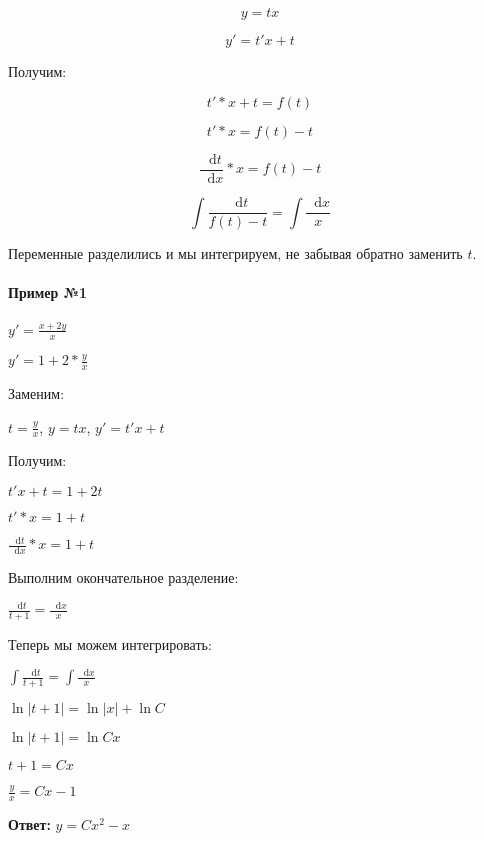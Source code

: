 \documentclass{article}
\newcommand*\diff{\mathop{}\!\mathrm{d}}
\begin{document}
$$y = tx$$

$$y' = t' x + t$$

Получим:

$$t' * x + t = f(t)$$

$$t' * x = f(t) - t$$

$$\frac{\diff t}{\diff x} * x = f(t) - t$$

$$\int \frac{\diff t}{f(t) - t} = \int \frac{\diff x}{x}$$

Переменные разделились и мы интегрируем, не забывая обратно заменить $t$.

\paragraph{Пример №1}

$y' = \frac{x + 2y}{x}$

$y' = 1 + 2 * \frac{y}{x}$

Заменим:

$t = \frac{y}{x}$, $y = tx$, $y' = t' x + t$

Получим:

$t'x + t = 1 + 2t$

$t' * x = 1 + t$

$\frac{\diff t}{\diff x} * x = 1 + t$

Выполним окончательное разделение:

$\frac{\diff t}{t + 1} = \frac{\diff x}{x}$

Теперь мы можем интегрировать:

$\int \frac{\diff t}{t + 1} = \int \frac{\diff x}{x}$

$\ln |t + 1| = \ln |x| + \ln C$

$\ln |t + 1| = \ln Cx$

$t + 1 = Cx$

$\frac{y}{x} = Cx - 1$

\textbf{Ответ:} $y = Cx^2 - x$
\end{document}
